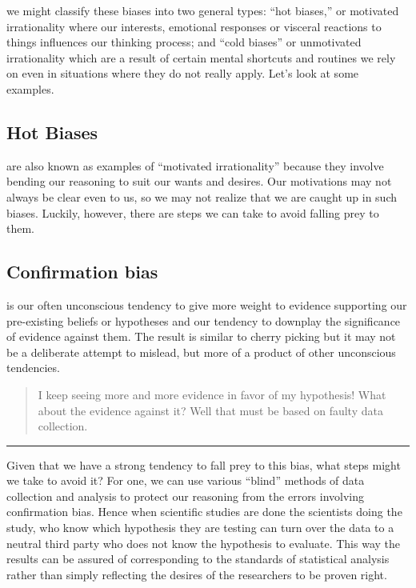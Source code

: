 \documentclass[justified]{tufte-book}
\newenvironment{argument}{\begin{quote}\normalsize}{\end{quote}}
\begin{document}
 we might classify these biases into two general types: ``hot biases,'' or motivated irrationality where our interests, emotional responses or visceral reactions to things influences our thinking process; and ``cold biases'' or unmotivated irrationality which are a result of certain mental shortcuts and routines we rely on even in situations where they do not really apply. Let's look at some examples.

\hypertarget{hot-biases}{%
\subsection*{\texorpdfstring{\textbf{Hot Biases}}{Hot Biases}}\label{hot-biases}}

 are also known as examples of ``motivated irrationality'' because they involve bending our reasoning to suit our wants and desires. Our motivations may not always be clear even to us, so we may not realize that we are caught up in such biases. Luckily, however, there are steps we can take to avoid falling prey to them.

\hypertarget{confirmation-bias}{%
\subsection*{Confirmation bias}\label{confirmation-bias}}

 is our often unconscious tendency to give more weight to evidence supporting our pre-existing beliefs or hypotheses and our tendency to downplay the significance of evidence against them. The result is similar to cherry picking but it may not be a deliberate attempt to mislead, but more of a product of other unconscious tendencies.

\begin{argument}
I keep seeing more and more evidence in favor of my hypothesis! What
about the evidence against it? Well that must be based on faulty data
collection.
\end{argument}

\begin{center}\rule{0.5\linewidth}{\linethickness}\end{center}

Given that we have a strong tendency to fall prey to this bias, what steps might we take to avoid it? For one, we can use various ``blind'' methods of data collection and analysis to protect our reasoning from the errors involving confirmation bias. Hence when scientific studies are done the scientists doing the study, who know which hypothesis they are testing can turn over the data to a neutral third party who does not know the hypothesis to evaluate. This way the results can be assured of corresponding to the standards of statistical analysis rather than simply reflecting the desires of the researchers to be proven right.
\end{document}
